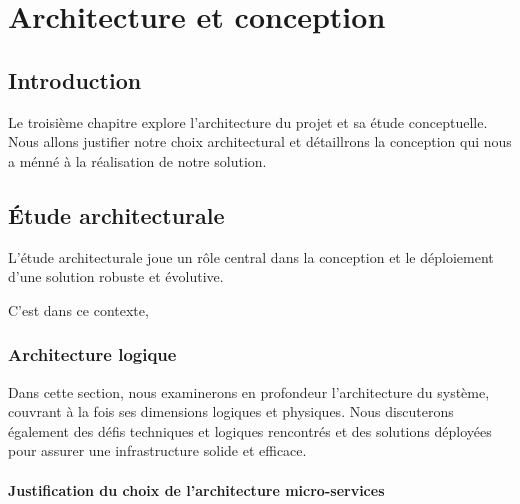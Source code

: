 \chapter{Architecture et conception}

\section*{Introduction}
    \par Le troisième chapitre explore l'architecture du projet et sa étude conceptuelle. 
Nous allons justifier notre choix architectural et détaillrons la conception qui nous a ménné à la réalisation de notre solution.

\section{Étude architecturale}
    \par  L'étude architecturale joue un rôle central dans la conception et le déploiement d'une solution robuste et évolutive.
    \par C'est dans ce contexte, 
\subsection{Architecture logique}
\par Dans cette section, nous examinerons en profondeur l'architecture du système, couvrant à la fois ses dimensions logiques et physiques. Nous discuterons également des défis techniques et logiques rencontrés et des solutions déployées pour assurer une infrastructure solide et efficace.\subsubsection{Justification du choix de l'architecture micro-services}

